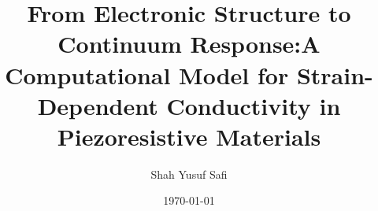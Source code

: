 \usepackage[margin=1in]{geometry}
\usepackage{amsmath}
\usepackage{amssymb}
\usepackage{graphicx}
\usepackage{hyperref}
\usepackage[backend=biber,style=numeric]{biblatex}

\title{From Electronic Structure to Continuum Response:A Computational Model for Strain-Dependent Conductivity in Piezoresistive Materials}
\author{Shah Yusuf Safi}
\date{\today}
